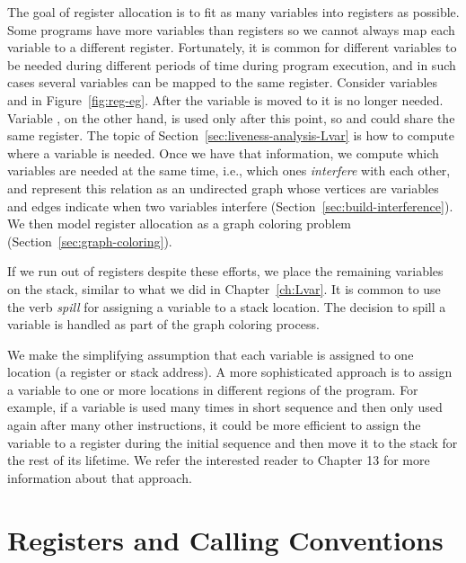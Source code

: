 \documentclass[7x10]{TimesAPriori_MIT}%
\begin{document}
The goal of register allocation is to fit as many variables into
registers as possible. Some programs have more variables than
registers so we cannot always map each variable to a different
register. Fortunately, it is common for different variables to be
needed during different periods of time during program execution, and
in such cases several variables can be mapped to the same register.
Consider variables  and  in Figure~\ref{fig:reg-eg}.
After the variable  is moved to  it is no longer
needed.  Variable , on the other hand, is used only after this
point, so  and  could share the same register. The
topic of Section~\ref{sec:liveness-analysis-Lvar} is how to compute
where a variable is needed.  Once we have that information, we compute
which variables are needed at the same time, i.e., which ones
\emph{interfere} with each other, and represent this relation as an
undirected graph whose vertices are variables and edges indicate when
two variables interfere (Section~\ref{sec:build-interference}). We
then model register allocation as a graph coloring problem
(Section~\ref{sec:graph-coloring}).

If we run out of registers despite these efforts, we place the
remaining variables on the stack, similar to what we did in
Chapter~\ref{ch:Lvar}. It is common to use the verb \emph{spill} for
assigning a variable to a stack location. The decision to spill a
variable is handled as part of the graph coloring process.

We make the simplifying assumption that each variable is assigned to
one location (a register or stack address). A more sophisticated
approach is to assign a variable to one or more locations in different
regions of the program.  For example, if a variable is used many times
in short sequence and then only used again after many other
instructions, it could be more efficient to assign the variable to a
register during the initial sequence and then move it to the stack for
the rest of its lifetime. We refer the interested reader to
\citet{Cooper:2011aa} Chapter 13 for more information about that
approach.


\section{Registers and Calling Conventions}
\label{sec:calling-conventions}
\end{document}
